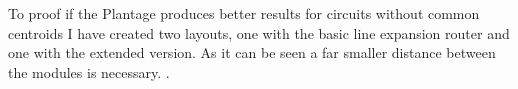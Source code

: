 To proof if the Plantage produces better results for circuits without common centroids I have created two layouts, one with the basic line expansion router and one with the extended version. As it can be seen a far smaller distance between the modules is necessary. .

\begin{figure}
	\centering

\end{figure}
